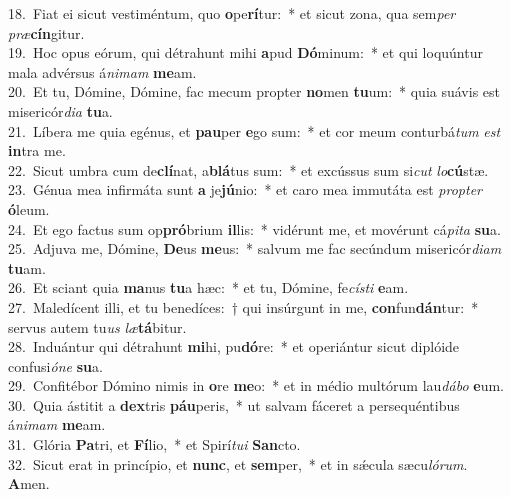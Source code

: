 {18.~}Fiat ei sicut vestiméntum, quo \textbf{o}pe\textbf{rí}tur:~* et sicut zona, qua sem\textit{per} \textit{præ}\textbf{cín}gitur.\\
{19.~}Hoc opus eórum, qui détrahunt mihi \textbf{a}pud \textbf{Dó}minum:~* et qui loquúntur mala advérsus á\textit{ni}\textit{mam} \textbf{me}am.\\
{20.~}Et tu, Dómine, Dómine, fac mecum propter \textbf{no}men \textbf{tu}um:~* quia suávis est misericór\textit{di}\textit{a} \textbf{tu}a.\\
{21.~}Líbera me quia egénus, et \textbf{pau}per \textbf{e}go sum:~* et cor meum conturbá\textit{tum} \textit{est} \textbf{in}tra me.\\
{22.~}Sicut umbra cum de\textbf{clí}nat, a\textbf{blá}tus sum:~* et excússus sum si\textit{cut} \textit{lo}\textbf{cú}stæ.\\
{23.~}Génua mea infirmáta sunt \textbf{a} je\textbf{jú}nio:~* et caro mea immutáta est \textit{prop}\textit{ter} \textbf{ó}leum.\\
{24.~}Et ego factus sum op\textbf{pró}brium \textbf{il}lis:~* vidérunt me, et movérunt cá\textit{pi}\textit{ta} \textbf{su}a.\\
{25.~}Adjuva me, Dómine, \textbf{De}us \textbf{me}us:~* salvum me fac secúndum misericór\textit{di}\textit{am} \textbf{tu}am.\\
{26.~}Et sciant quia \textbf{ma}nus \textbf{tu}a hæc:~* et tu, Dómine, fe\textit{cí}\textit{sti} \textbf{e}am.\\
{27.~}Maledícent illi, et tu benedíces:~† qui insúrgunt in me, \textbf{con}fun\textbf{dán}tur:~* servus autem tu\textit{us} \textit{læ}\textbf{tá}bitur.\\
{28.~}Induántur qui détrahunt \textbf{mi}hi, pu\textbf{dó}re:~* et operiántur sicut diplóide confusi\textit{ó}\textit{ne} \textbf{su}a.\\
{29.~}Confitébor Dómino nimis in \textbf{o}re \textbf{me}o:~* et in médio multórum lau\textit{dá}\textit{bo} \textbf{e}um.\\
{30.~}Quia ástitit a \textbf{dex}tris \textbf{páu}peris,~* ut salvam fáceret a persequéntibus á\textit{ni}\textit{mam} \textbf{me}am.\\
{31.~}Glória \textbf{Pa}tri, et \textbf{Fí}lio,~* et Spirí\textit{tu}\textit{i} \textbf{San}cto.\\
{32.~}Sicut erat in princípio, et \textbf{nunc}, et \textbf{sem}per,~* et in sǽcula sæcu\textit{ló}\textit{rum}. \textbf{A}men.\\
